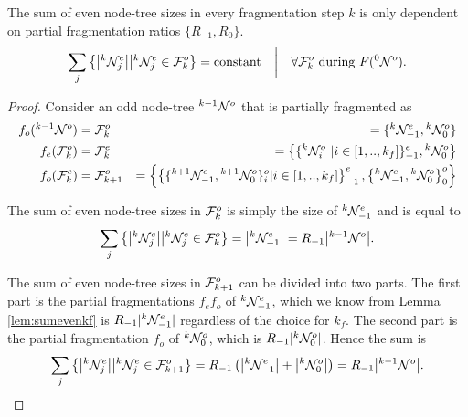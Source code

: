 \begin{lemma}\label{lem:equalevensum}
  The sum of even node-tree sizes in every fragmentation step $k$ is only dependent on partial fragmentation ratios $\{R_{-1}, R_0\}$. 
  \begin{equation}\label{eq:equalevensum}
    \sum_j{ \left\{ \abs{{}^{k}\mathcal{N}_j^e} \big| {}^{k}\mathcal{N}_j^e \in \mathcal{F}^o_k \right\} } = \text{constant}
  \hspace{1em} \bigg| \hspace{1em} \forall \mathcal{F}_k^o \text{ during } F({}^{0}\mathcal{N}^o).
  \end{equation}
\end{lemma}
\begin{proof}
  Consider an odd node-tree ${}^{k-1}\mathcal{N}^o$ that is partially fragmented as 
  \begin{eqnarray*}
    f_o({}^{k-1}\mathcal{N}^o) &= \mathcal{F}^o_k      &= \{{}^{k}\mathcal{N}^e_{-1}, {}^{k}\mathcal{N}^o_0 \} \\
    f_e(\mathcal{F}^o_k)        &= \mathcal{F}^e_k      &= \left\{ \{{}^{k}\mathcal{N}^o_i\ | i \in [1,..,k_f] \}^e_{-1}, {}^{k}\mathcal{N}^{o}_0 \right\} \\
    f_o(\mathcal{F}^e_k )       &= \mathcal{F}^o_{k+1}  &= \left\{ \left\{ \{{}^{k+1}\mathcal{N}^e_{-1}, {}^{k+1}\mathcal{N}^o_0\}_i^o | i \in [1,..,k_f] \right\}^e_{-1}, \left\{{}^{k}\mathcal{N}^e_{-1}, {}^{k}\mathcal{N}^o_0 \right\}^{o}_0 \right\}
  \end{eqnarray*}

  The sum of even node-tree sizes in $\mathcal{F}^o_k$ is simply the size of ${}^{k}\mathcal{N}^e_{-1}$ and is equal to
  \begin{equation*}
    \sum_j{ \left\{ \abs{{}^{k}\mathcal{N}_j^e} \big| {}^{k}\mathcal{N}_j^e \in \mathcal{F}^o_k \right\} } = \abs{{}^{k}\mathcal{N}^e_{-1}} = R_{-1}\abs{{}^{k-1}\mathcal{N}^o}. 
  \end{equation*}

  The sum of even node-tree sizes in $\mathcal{F}^o_{k+1}$ can be divided into two parts. The first part is the partial fragmentations $f_e f_o$ of ${}^{k}\mathcal{N}^e_{-1}$, which we know from Lemma \ref{lem:sumevenkf} is $R_{-1}|{}^{k}\mathcal{N}^e_{-1}|$ regardless of the choice for $k_f$. The second part is the partial fragmentation $f_o$ of ${}^{k}\mathcal{N}^o_0$, which is $R_{-1}|{}^{k}\mathcal{N}^o_0|$. Hence the sum is
  \begin{equation*}
    \sum_j{ \left\{ \abs{{}^{k}\mathcal{N}_j^e} \big| {}^{k}\mathcal{N}_j^e \in \mathcal{F}^o_{k+1} \right\} } = R_{-1} \left( \abs{{}^{k}\mathcal{N}^e_{-1}} + \abs{{}^{k}\mathcal{N}^o_0} \right) = R_{-1}\abs{{}^{k-1}\mathcal{N}^o}. 
  \end{equation*}
\end{proof}

